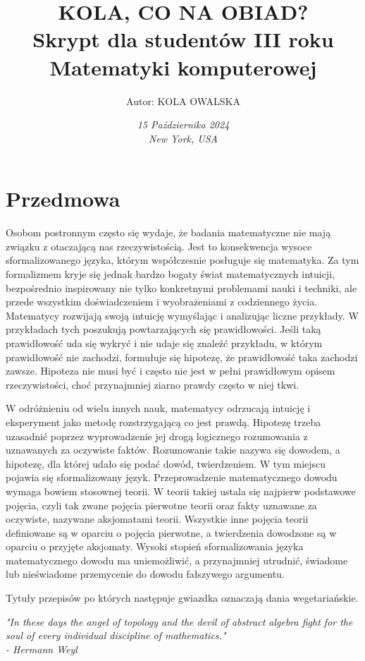 \documentclass[a4paper,10pt]{book}
\title{\Huge \textbf{KOLA, CO NA OBIAD?}\\
\vspace{0.5cm}
\Large Skrypt dla studentów III roku Matematyki komputerowej}
\author{Autor: KOLA OWALSKA}
\date{\vfill \large \textit{15 Października 2024}\\
\textit{New York, USA}}
\begin{document}
\maketitle
\newpage

\chapter*{Przedmowa} 
\thispagestyle{empty} 

Osobom postronnym często się wydaje, że badania matematyczne nie mają związku z otaczającą nas rzeczywistością. Jest to konsekwencja wysoce sformalizowanego języka, którym współczesnie posługuje się matematyka. Za tym formalizmem kryje się jednak bardzo bogaty świat matematycznych intuicji, bezpośrednio inspirowany nie tylko konkretnymi problemami nauki i techniki, ale przede wszystkim doświadczeniem i wyobrażeniami z codziennego życia. Matematycy rozwijają swoją intuicję wymyślając i analizując liczne przykłady. W przykładach tych poszukują powtarzających się prawidłowości. Jeśli taką prawidłowość uda się wykryć i nie udaje się znaleźć przykładu, w którym prawidłowość nie zachodzi, formułuje się hipotezę, że prawidłowość taka zachodzi zawsze. Hipoteza nie musi być i często nie jest w pełni prawidłowym opisem rzeczywistości, choć przynajmniej ziarno prawdy często w niej tkwi.

W odróżnieniu od wielu innych nauk, matematycy odrzucają intuicję i eksperyment jako metodę rozstrzygającą co jest prawdą. Hipotezę trzeba uzasadnić poprzez wyprowadzenie jej drogą logicznego rozumowania z uznawanych za oczywiste faktów. Rozumowanie takie nazywa się dowodem, a hipotezę, dla której udało się podać dowód, twierdzeniem. W tym miejscu pojawia się sformalizowany język. Przeprowadzenie matematycznego dowodu wymaga bowiem stosownej teorii. W teorii takiej ustala się najpierw podstawowe pojęcia, czyli tak zwane pojęcia pierwotne teorii oraz fakty uznawane za oczywiste, nazywane aksjomatami teorii. Wszystkie inne pojęcia teorii definiowane są w oparciu o pojęcia pierwotne, a twierdzenia dowodzone są w oparciu o przyjęte aksjomaty. Wysoki stopień sformalizowania języka matematycznego dowodu ma uniemożliwić, a przynajmniej utrudnić, świadome lub nieświadome przemycenie do dowodu fałszywego argumentu.

Tytuły przepisów po których następuje gwiazdka oznaczają dania wegetariańskie.

\vspace{1cm} 
\begin{flushright}
    \textit{"In these days the angel of topology and the devil of abstract algebra fight for the soul of every individual discipline of mathematics."} \\
    \textit{- Hermann Weyl}
\end{flushright}
\end{document}
